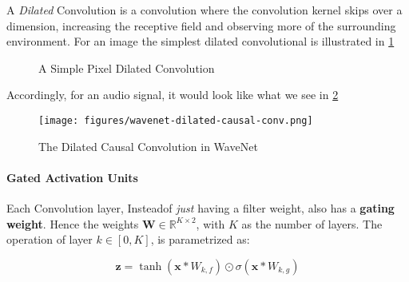 A \textit{Dilated} Convolution is a convolution where the convolution kernel skips over a dimension, increasing the receptive field and observing more of the surrounding environment. 
For an image the simplest dilated convolutional is illustrated in \cref{fig:wavenet-dilated-conv}
\begin{figure}[!ht]
    \begin{small}
        \begin{center}
        \end{center}
        \caption{A Simple Pixel Dilated Convolution}
        \label{fig:wavenet-dilated-conv}
    \end{small}
\end{figure}

Accordingly, for an audio signal, it would look like what we see in \cref{fig:wavenet-dilated-causal-conv}



\begin{figure}
    \begin{small}
        \begin{center}
            \texttt{[image: figures/wavenet-dilated-causal-conv.png]}
        \end{center}
        \caption{The Dilated Causal Convolution in WaveNet} 
        \label{fig:wavenet-dilated-causal-conv}
    \end{small}
\end{figure}



\paragraph{Gated Activation Units}
Each Convolution layer, Insteadof \textit{just} having a filter weight, also has a \textbf{gating weight}.
Hence the weights \(\mathbf{W} \in \mathbb{R}^{K \times 2} \), with \(K\) as the number of layers. 
The operation of layer $k \in [0, K]$, is parametrized as: 

\begin{equation}
    \mathbf{z} = \tanh ( \mathbf{x} * W_{k, f} ) \odot \sigma ( \mathbf{x} * W_{k, g} )
    \label{eq:wavenet-gated-activation}
\end{equation}





